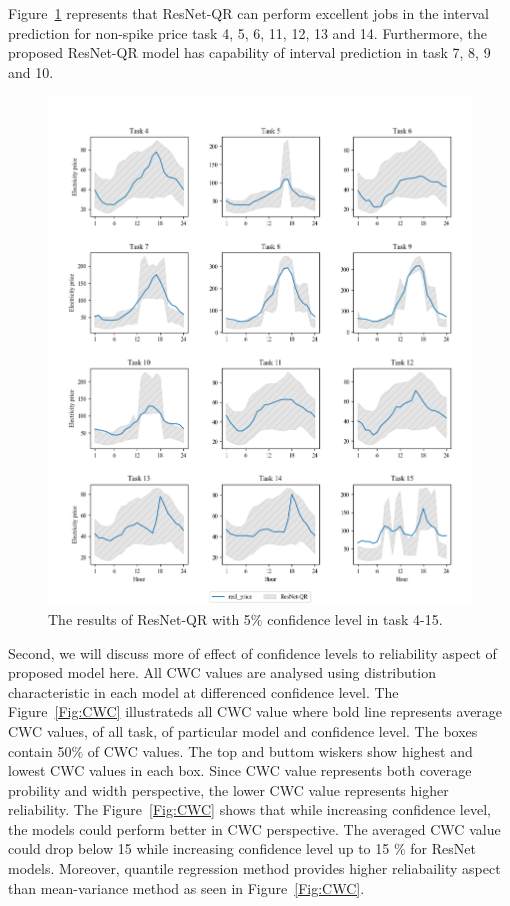 \documentclass[review]{elsarticle}
\begin{document}
    Figure~\ref{Fig:all_task_QR_005} represents that ResNet-QR can perform excellent jobs in the interval prediction for non-spike price task 4, 5, 6, 11, 12, 13 and 14.
    Furthermore, the proposed ResNet-QR model has capability of interval prediction in task 7, 8, 9 and 10.
    \begin{figure}[H]
      \centering
      \includegraphics[width=15cm]{All_task_with_spike_price_QR_005}
      \caption{The results of ResNet-QR with 5$\%$ confidence level in task 4-15.}
      \label{Fig:all_task_QR_005}
    \end{figure}



    Second, we will discuss more of effect of confidence levels to reliability aspect of proposed model here.
    All CWC values are analysed using distribution characteristic in each model at differenced confidence level.
    The Figure~\ref{Fig:CWC} illustrateds all CWC value where bold line represents average CWC values, of all task, of particular model and confidence level.
    The boxes contain 50$\%$ of CWC values.
    The top and buttom wiskers show highest and lowest CWC values in each box.
    Since CWC value represents both coverage probility and width perspective, the lower CWC value represents higher reliability.
    The Figure~\ref{Fig:CWC} shows that while increasing confidence level, the models could perform better in CWC perspective.
    The averaged CWC value could drop below 15 while increasing confidence level up to 15 $\%$ for ResNet models.
    Moreover, quantile regression method provides higher reliabaility aspect than mean-variance method as seen in Figure~\ref{Fig:CWC}.
\end{document}
